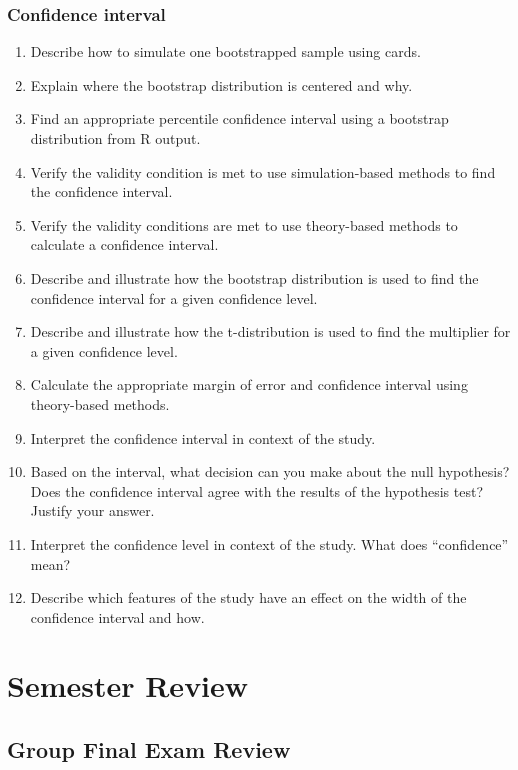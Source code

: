 \documentclass[
]{report}
\begin{document}
\subsection*{Confidence interval}\label{confidence-interval-9}

\begin{enumerate}
\def\labelenumi{\arabic{enumi}.}
\setcounter{enumi}{29}
\item
  Describe how to simulate one bootstrapped sample using cards.
\item
  Explain where the bootstrap distribution is centered and why.
\item
  Find an appropriate percentile confidence interval using a bootstrap distribution from R output.
\item
  Verify the validity condition is met to use simulation-based methods to find the confidence interval.
\item
  Verify the validity conditions are met to use theory-based methods to calculate a confidence interval.
\item
  Describe and illustrate how the bootstrap distribution is used to find the confidence interval for a given confidence level.
\item
  Describe and illustrate how the t-distribution is used to find the multiplier for a given confidence level.
\item
  Calculate the appropriate margin of error and confidence interval using theory-based methods.
\item
  Interpret the confidence interval in context of the study.
\item
  Based on the interval, what decision can you make about the null hypothesis? Does the confidence interval agree with the results of the hypothesis test? Justify your answer.
\item
  Interpret the confidence level in context of the study. What does ``confidence'' mean?
\item
  Describe which features of the study have an effect on the width of the confidence interval and how.
\end{enumerate}

\newpage

\chapter{Semester Review}\label{semester-review}

\section{Group Final Exam Review}\label{group-final-exam-review}
\end{document}
